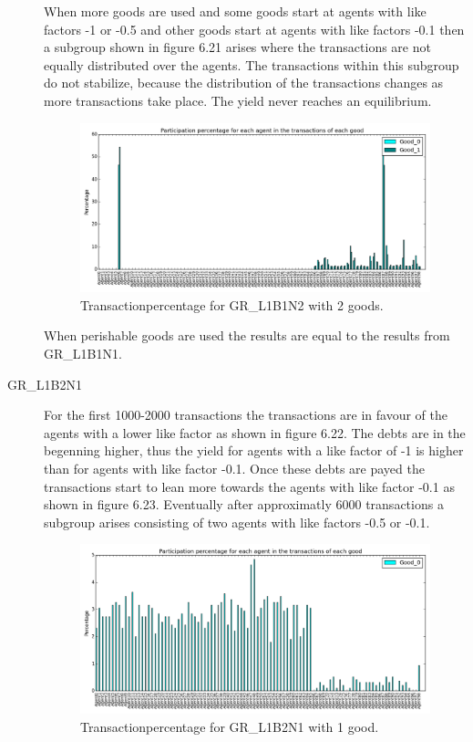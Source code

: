 \documentclass[twoside,openright]{uva-bachelor-thesis}
\begin{document}
\begin{description}
When more goods are used and some goods start at agents with like factors -1 or -0.5 and other goods start at agents with like factors -0.1 then a subgroup shown in figure 6.21 arises where the transactions are not equally distributed over the agents. The transactions within this subgroup do not stabilize, because the distribution of the transactions changes as more transactions take place. The yield never reaches an equilibrium. \\
\begin{figure}[h!]
  \centering
\includegraphics[scale=0.4]{Simulation_figures/GR_L1B1N2/2goods_spikes}
  \caption{Transactionpercentage for GR\_L1B1N2 with 2 goods.}
\end{figure}

When perishable goods are used the results are equal to the results from GR\_L1B1N1.
\clearpage
\item[GR\_L1B2N1] For the first 1000-2000 transactions the transactions are in favour of the agents with a lower like factor as shown in figure 6.22. The debts are in the begenning higher, thus the yield for agents with a like factor of -1 is higher than for agents with like factor -0.1. Once these debts are payed the transactions start to lean more towards the agents with like factor -0.1 as shown in figure 6.23. Eventually after approximatly 6000 transactions a subgroup arises consisting of two agents with like factors -0.5 or -0.1.
\begin{figure}[h!]
  \centering
\includegraphics[scale=0.4]{Simulation2_figures/GR_L1B2N1_1good_2k} 
  \caption{Transactionpercentage for GR\_L1B2N1 with 1 good.}
\end{figure}


\end{description}
\end{document}
